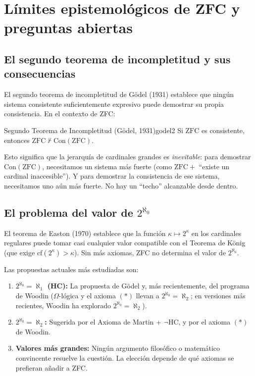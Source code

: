 \section{Límites epistemológicos de ZFC y preguntas abiertas}

\subsection{El segundo teorema de incompletitud y sus consecuencias}

El segundo teorema de incompletitud de Gödel (1931) establece que ningún sistema consistente suficientemente expresivo puede demostrar su propia consistencia. En el contexto de ZFC:

\begin{teorema}{Segundo Teorema de Incompletitud (Gödel, 1931)}{godel2}
Si $\mathrm{ZFC}$ es consistente, entonces $\mathrm{ZFC} \not\vdash \mathrm{Con}(\mathrm{ZFC})$.
\end{teorema}

Esto significa que la jerarquía de cardinales grandes es \emph{inevitable}: para demostrar $\mathrm{Con}(\mathrm{ZFC})$, necesitamos un sistema más fuerte (como $\mathrm{ZFC} +$ ``existe un cardinal inaccesible''). Y para demostrar la consistencia de ese sistema, necesitamos uno aún más fuerte. No hay un ``techo'' alcanzable desde dentro.

\subsection{El problema del valor de $2^{\aleph_0}$}

El teorema de Easton (1970) establece que la función $\kappa \mapsto 2^\kappa$ en los cardinales regulares puede tomar casi cualquier valor compatible con el Teorema de König (que exige $\mathrm{cf}(2^\kappa) > \kappa$). Sin más axiomas, ZFC no determina el valor de $2^{\aleph_0}$.

Las propuestas actuales más estudiadas son:
\begin{enumerate}[leftmargin=2em, label=(\alph*)]
  \item \textbf{$2^{\aleph_0} = \aleph_1$ (HC):} La propuesta de Gödel y, más recientemente, del programa de Woodin ($\Omega$-lógica y el axioma $(\ast)$ llevan a $2^{\aleph_0} = \aleph_2$; en versiones más recientes, Woodin ha explorado $2^{\aleph_0} = \aleph_2$).
  \item \textbf{$2^{\aleph_0} = \aleph_2$:} Sugerida por el Axioma de Martin + $\neg\mathrm{HC}$, y por el axioma $(\ast)$ de Woodin.
  \item \textbf{Valores más grandes:} Ningún argumento filosófico o matemático convincente resuelve la cuestión. La elección depende de qué axiomas se prefieran añadir a ZFC.
\end{enumerate}

